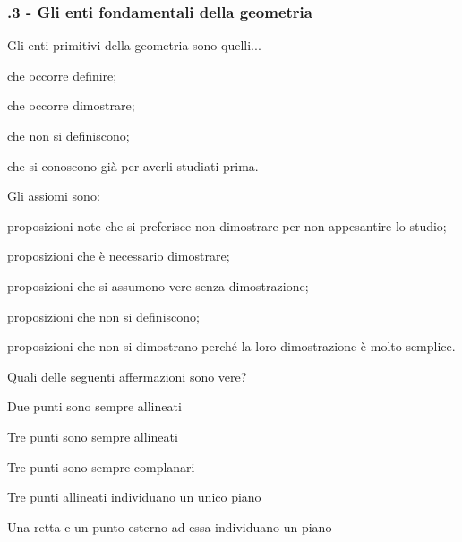 \subsubsection*{\thechapter.3 - Gli enti fondamentali della geometria}

\begin{esercizio}
\label{ese:1.32}
Gli enti primitivi della geometria sono quelli...
\begin{enumeratea}
\item che occorre definire;
\item che occorre dimostrare;
\item che non si definiscono;
\item che si conoscono già per averli studiati prima.
\end{enumeratea}
\end{esercizio}

\begin{esercizio}
\label{ese:1.33}
Gli assiomi sono:
\begin{enumeratea}
\item proposizioni note che si preferisce non dimostrare per non appesantire lo studio;
\item proposizioni che è necessario dimostrare;
\item proposizioni che si assumono vere senza dimostrazione;
\item proposizioni che non si definiscono;
\item proposizioni che non si dimostrano perché la loro dimostrazione è molto semplice.
\end{enumeratea}
\end{esercizio}
	
\begin{esercizio}
\label{ese:1.34}
Quali delle seguenti affermazioni sono vere?
\begin{enumeratea}
\item Due punti sono sempre allineati		\tab\tab\tab\tab\boxV\quad\boxF
\item Tre punti sono sempre allineati		\tab\tab\tab\tab\boxV\quad\boxF
\item Tre punti sono sempre complanari		\tab\tab\tab\tab\boxV\quad\boxF
\item Tre punti allineati individuano un unico piano	\tab\tab\boxV\quad\boxF
\item Una retta e un punto esterno ad essa individuano un piano \tab\boxV\quad\boxF
\end{enumeratea}
\end{esercizio}

